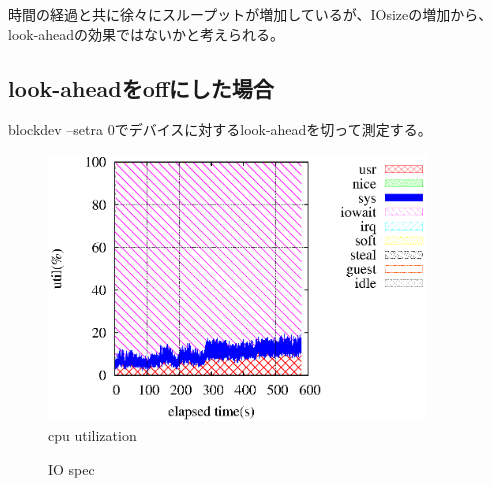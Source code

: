 \documentclass[11pt,a4paper]{jsarticle}
\newlength{\subfigwidth}
\newlength{\subfigcolsep}
\begin{document}
時間の経過と共に徐々にスループットが増加しているが、IOsizeの増加から、
look-aheadの効果ではないかと考えられる。

\subsection{look-aheadをoffにした場合}
blockdev --setra 0でデバイスに対するlook-aheadを切って測定する。
\begin{figure}[thbp]
 \begin{center}
  \includegraphics[width=100mm]{1idxscan_ra0core1.eps}
 \end{center}
 \caption{cpu utilization}
 \label{fig:1idx0core1}
\end{figure}

\begin{figure}[thbp]
 \setlength{\subfigwidth}{.5\linewidth}
 \addtolength{\subfigwidth}{-.5\subfigcolsep}
 \begin{minipage}[b]{\subfigwidth}
 \end{minipage}
  \begin{minipage}[b]{\subfigwidth}
  \end{minipage}
  \caption{IO spec}
  \label{fig:1idxra0}
\end{figure}
\end{document}
